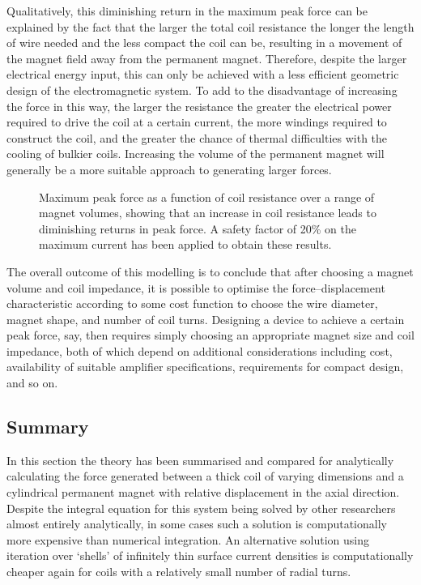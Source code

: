 \documentclass[11pt,a4paper]{memoir}
\begin{document}
Qualitatively, this diminishing return in the maximum peak force can be explained by the fact that the larger the total coil resistance the longer the length of wire needed and the less compact the coil can be, resulting in a movement of the magnet field away from the permanent magnet.
Therefore, despite the larger electrical energy input, this can only be achieved with a less efficient geometric design of the electromagnetic system.
To add to the disadvantage of increasing the force in this way, the larger the resistance the greater the electrical power required to drive the coil at a certain current, the more windings required to construct the coil, and the greater the chance of thermal difficulties with the cooling of bulkier coils.
Increasing the volume of the permanent magnet will generally be a more suitable approach to generating larger forces.

\begin{figure}
\centering
{}
\caption[Maximum peak force as a function of coil resistance over a range of magnet volumes.]{Maximum peak force as a function of coil resistance over a range of magnet volumes, showing that an increase in coil resistance leads to diminishing returns in peak force.
A safety factor of 20\% on the maximum current has been applied to obtain these results.}
\end{figure}

The overall outcome of this modelling is to conclude that after choosing a magnet volume and coil impedance, it is possible to optimise the force--displacement characteristic according to some cost function to choose the wire diameter, magnet shape, and number of coil turns.
Designing a device to achieve a certain peak force, say, then requires simply choosing an appropriate magnet size and coil impedance, both of which depend on additional considerations including cost, availability of suitable amplifier specifications, requirements for compact design, and so on.

\subsection{Summary}

In this section the theory has been summarised and compared for analytically calculating the force generated between a thick coil of varying dimensions and a cylindrical permanent magnet with relative displacement in the axial direction.
Despite the integral equation for this system being solved by other researchers almost entirely analytically, in some cases such a solution is computationally more expensive than numerical integration.
An alternative solution using iteration over `shells' of infinitely thin surface current densities is computationally cheaper again for coils with a relatively small number of radial turns.
\end{document}
